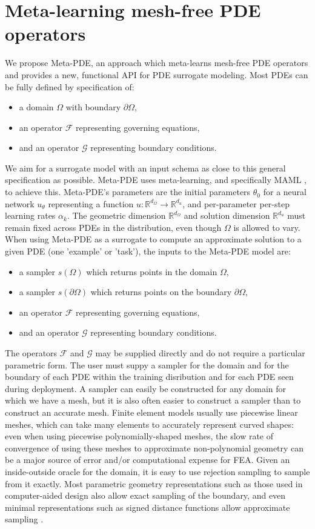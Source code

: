 \section{Meta-learning mesh-free PDE operators}
We propose Meta-PDE, an approach which meta-learns mesh-free PDE operators and
provides a new, functional API for PDE surrogate modeling.
Most PDEs can be fully defined by specification of:
\begin{itemize}
  \item a domain $\Omega$ with boundary $\partial \Omega$,
  \item an operator $\mathcal{F}$ representing governing equations,
  \item and an operator $\mathcal{G}$ representing boundary conditions.
\end{itemize}
We aim for a surrogate model with an input schema as close to this general specification as possible.
Meta-PDE uses meta-learning, and specifically MAML \citep{}, to achieve this.
Meta-PDE's parameters are the initial parameters $\theta_0$ for a neural network
$u_\theta$ representing
a function $u: \mathbb{R}^{d_\Omega} \to \mathbb{R}^{d_u}$,
and per-parameter per-step learning rates $\alpha_k$.
The geometric dimension $\mathbb{R}^{d_\Omega}$ and solution dimension $\mathbb{R}^{d_u}$
must remain fixed across PDEs in the distribution, even though $\Omega$ is allowed to vary.
When using Meta-PDE as a surrogate to compute an approximate solution to a given PDE
(one 'example' or 'task'),
the inputs to the Meta-PDE model are:
\begin{itemize}
  \item a sampler $s(\Omega)$ which returns points in the domain $\Omega$,
  \item a sampler $s(\partial\Omega)$ which returns points on the boundary $\partial\Omega$,
  \item an operator $\mathcal{F}$ representing governing equations,
  \item and an operator $\mathcal{G}$ representing boundary conditions.
\end{itemize}

The operators $\mathcal{F}$ and $\mathcal{G}$ may be supplied directly and do not
require a particular parametric form.
The user must suppy a sampler for the domain and for the boundary of each PDE within
the training disribution and for each PDE seen during deployment.
A sampler can easily be constructed for any domain for which we have a mesh,
but it is also often easier to construct a sampler than to construct an accurate mesh.
Finite element models usually use piecewise linear meshes, which can take many elements
to accurately represent curved shapes: even when using piecewise polynomially-shaped meshes,
the slow rate of convergence of using these meshes to approximate
non-polynomial geometry can be a major source of error and/or computational expense
for FEA.
Given an inside-outside oracle for the domain, it is easy to use rejection sampling
to sample from it exactly.
Most parametric geometry representations such as those used
in computer-aided design also allow exact sampling of the boundary, and even
minimal representations such as signed distance functions allow approximate
sampling \citep{brubaker2012family}.


